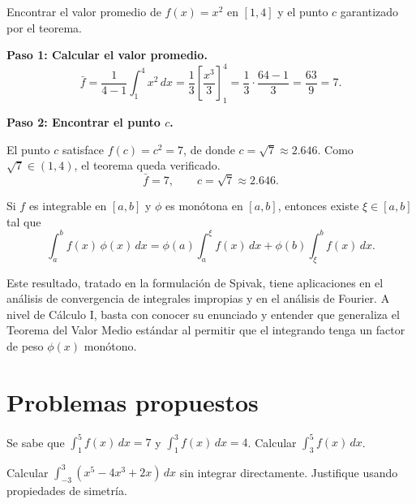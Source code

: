 \begin{example}
Encontrar el valor promedio de $f(x) = x^2$ en $[1,4]$ y el punto $c$ garantizado por el teorema.

\begin{myproof}

\textbf{Paso 1: Calcular el valor promedio.}
\[
\bar{f} = \frac{1}{4-1}\int_{1}^{4} x^2\,dx
= \frac{1}{3}\left[\frac{x^3}{3}\right]_1^4
= \frac{1}{3}\cdot\frac{64-1}{3} = \frac{63}{9} = 7.
\]

\textbf{Paso 2: Encontrar el punto $c$.}

El punto $c$ satisface $f(c) = c^2 = 7$, de donde $c = \sqrt{7} \approx 2.646$. Como $\sqrt{7} \in (1,4)$, el teorema queda verificado.
\[
\boxed{\bar{f} = 7, \qquad c = \sqrt{7} \approx 2.646.}
\]
\end{myproof}
\end{example}

\begin{theorem}
Si $f$ es integrable en $[a,b]$ y $\phi$ es monótona en $[a,b]$, entonces existe $\xi \in [a,b]$ tal que
\[
\int_{a}^{b} f(x)\,\phi(x)\,dx = \phi(a)\int_{a}^{\xi} f(x)\,dx + \phi(b)\int_{\xi}^{b} f(x)\,dx.
\]
\end{theorem}

\begin{rem}
Este resultado, tratado en la formulación de Spivak, tiene aplicaciones en el análisis de convergencia de integrales impropias y en el análisis de Fourier. A nivel de Cálculo I, basta con conocer su enunciado y entender que generaliza el Teorema del Valor Medio estándar al permitir que el integrando tenga un factor de peso $\phi(x)$ monótono.
\end{rem}


\section{Problemas propuestos}


\begin{prob}
Se sabe que $\displaystyle\int_{1}^{5} f(x)\,dx = 7$ y $\displaystyle\int_{1}^{3} f(x)\,dx = 4$. Calcular $\displaystyle\int_{3}^{5} f(x)\,dx$.
\end{prob}

\begin{prob}
Calcular $\displaystyle\int_{-3}^{3}(x^5 - 4x^3 + 2x)\,dx$ sin integrar directamente. Justifique usando propiedades de simetría.
\end{prob}

